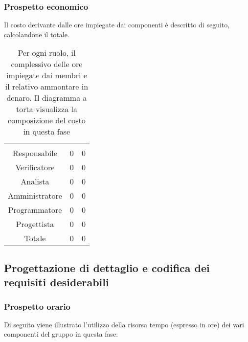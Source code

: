\subsubsection{Prospetto economico}
Il costo derivante dalle ore impiegate dai componenti è descritto di seguito, calcolandone il totale.

\begin{table}[H]
{\setlength{\parindent}{0cm}
\begin{minipage}{.43\textwidth}
	\begin{tabular}{ccc}
	\rowcolorhead
	\headertitle{Ruolo} & \headertitle{Ore} & \headertitle{Costo(€)}\\
	Responsabile & 0 & 0\\
	Verificatore & 0 & 0\\
	Analista & 0 & 0\\
	Amministratore & 0 & 0\\
	Programmatore & 0 & 0\\
	Progettista & 0 & 0\\
	\hline
	Totale & 0& 0\\
	\end{tabular}
\end{minipage}%
\begin{minipage}{.57\textwidth}
\end{minipage} }
\caption{Per ogni ruolo, il complessivo delle ore impiegate dai membri e il relativo ammontare in denaro. Il diagramma a torta visualizza la composizione del costo in questa fase}
\end{table}




\subsection{Progettazione di dettaglio e codifica dei requisiti desiderabili}
\subsubsection{Prospetto orario}
Di seguito viene illustrato l'utilizzo della risorsa tempo (espresso in ore) dei vari componenti del gruppo in questa fase:

